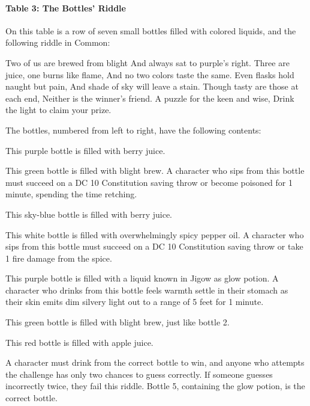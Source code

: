 \documentclass[10pt,a4paper,twoside,twocolumn,openany,nodeprecatedcode]{dndbook}
\begin{document}
\paragraph{Table 3: The Bottles' Riddle}
On this table is a row of seven small bottles filled with colored liquids, and the following riddle in Common:

\begin{DndReadAloud}{}
Two of us are brewed from blight And always sat to purple's right. Three are juice, one burns like flame, And no two colors taste the same. Even flasks hold naught but pain, And shade of sky will leave a stain. Though tasty are those at each end, Neither is the winner's friend. A puzzle for the keen and wise, Drink the light to claim your prize.

\end{DndReadAloud}

The bottles, numbered from left to right, have the following contents:


\begin{description}[nolistsep]
\item[Bottle 1.]
This purple bottle is filled with berry juice.
\item[Bottle 2.]
This green bottle is filled with blight brew. A character who sips from this bottle must succeed on a DC 10 Constitution saving throw or become poisoned for 1 minute, spending the time retching.
\item[Bottle 3.]
This sky-blue bottle is filled with berry juice.
\item[Bottle 4.]
This white bottle is filled with overwhelmingly spicy pepper oil. A character who sips from this bottle must succeed on a DC 10 Constitution saving throw or take 1 fire damage from the spice.
\item[Bottle 5.]
This purple bottle is filled with a liquid known in Jigow as glow potion. A character who drinks from this bottle feels warmth settle in their stomach as their skin emits dim silvery light out to a range of 5 feet for 1 minute.
\item[Bottle 6.]
This green bottle is filled with blight brew, just like bottle 2.
\item[Bottle 7.]
This red bottle is filled with apple juice.
\end{description}

A character must drink from the correct bottle to win, and anyone who attempts the challenge has only two chances to guess correctly. If someone guesses incorrectly twice, they fail this riddle. Bottle 5, containing the glow potion, is the correct bottle.
\end{document}
